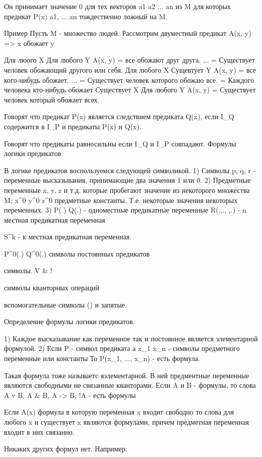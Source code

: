 Он принимает значение 0 для тех векторов a1 a2 ... an из M для которых предикат P(x) a1, ... an тождественно ложный на M.




Пример
Пусть M - множество людей. Рассмотрим двуместный предикат A(x, y) => x обожает y

Для люого X Для любого Y A(x, y) = все обожают друг друга.
... = Существует человек обожающий другого или себя.
Для любого X Сущевтует Y A(x, y) = все кого-нибудь обожает.
... = Существует человек которого обожаю все.
= Каждого человека кто-нибудь обожает
Существует X Для любого Y A(x, y) = Существует человек который обожает всех.

Говорят что предикат P(x) является следствием предиката Q(x), если
I_Q содержится в I_P и предикаты P(x) и Q(x).

Говорят что предикаты равносильны если I_Q и I_P совпадают.
Формулы логики предикатов

В логике предикатов воспользуемся следующей символикой.
1) Символы p, q, r - переменные высказывания, принимающие два значения 1 или 0.
2) Предметные переменные x, y, z и т.д. которые пробегают значение из некоторого множества M; x^0 y^0 z^0 предметные константы. Т.е. некоторые значения некоторых переменных.
3) P(.) Q(.) - одноместные предикатные переменные R(.,., ,.) - n местная предикатная переменная

S^k - к местная предикатная переменная.

P^0(.) Q^0(.) символы постоянных предикатов

символы.
V & !

символы кванторных операций


вспомогательные символы
() и запятые.

Определение формулы логики предикатов.

1) Каждое высказывание как переменное так и постоянное является элементарной формулой.
2) Если P - символ предиката а x_1 x_n - символы предметного переменные или константы
То P(x_1, ..., x_n) - есть формула.

Такая формула тоже называетс яэлементарной. В ней предментные переменные являются свободными не связанные кванторами.
Если A и B - формулы, то слова A v B, A & B, A -> B, !A - есть формулы

Если A(x) формула в которую переменная x входит свободно то слова для любого x и существует x являются формулами, причем предметная переменная входит в них связанно.

Никаких других формул нет. Например:

